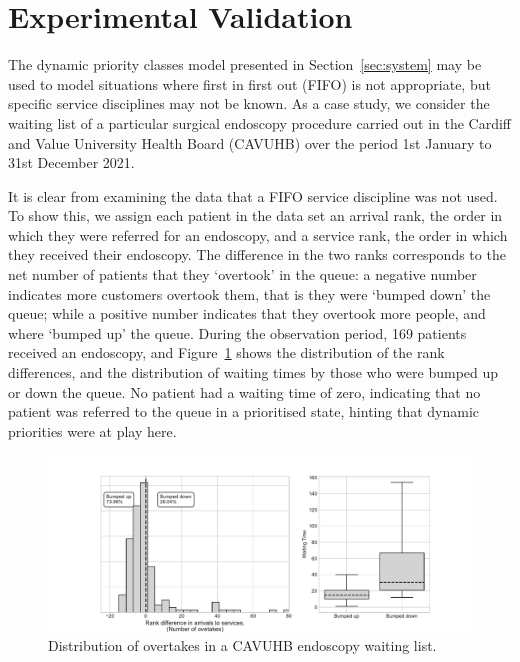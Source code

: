 \documentclass{article}
\begin{document}
\section{Experimental Validation}\label{sec:validation}
The dynamic priority classes model presented in Section~\ref{sec:system} may be
used to model situations where first in first out (FIFO) is not appropriate, but
specific service disciplines may not be known. As a case study, we consider the
waiting list of a particular surgical endoscopy procedure carried out in the
Cardiff and Value University Health Board (CAVUHB) over the period 1st January
to 31st December 2021.

It is clear from examining the data that a FIFO service discipline was not used.
To show this, we assign each patient in the data set an arrival rank, the order
in which they were referred for an endoscopy, and a service rank, the order in
which they received their endoscopy. The difference in the two ranks corresponds
to the net number of patients that they `overtook' in the queue: a negative
number indicates more customers overtook them, that is they were `bumped down'
the queue; while a positive number indicates that they overtook more people, and
where `bumped up' the queue. During the observation period, 169 patients
received an endoscopy, and Figure~\ref{fig:motivating_overtakes} shows the
distribution of the rank differences, and the distribution of waiting times by
those who were bumped up or down the queue. No patient had a waiting time of
zero, indicating that no patient was referred to the queue in a prioritised
state, hinting that dynamic priorities were at play here. 

\begin{figure}[!htbp]
  \begin{center}
    \includegraphics[width=\textwidth]{img/motivating_overtakes.pdf}
  \end{center}
  \caption{Distribution of overtakes in a CAVUHB endoscopy waiting list.}
  \label{fig:motivating_overtakes}
\end{figure}
\end{document}
